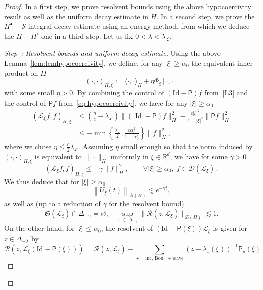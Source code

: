 \documentclass[10pt]{amsart}
\theoremstyle{definition}\newtheorem{defi}[theo]{Definition}\newtheorem{rema}[theo]{Remark}\newtheorem{exam}[theo]{Example}\newtheorem{exem}[theo]{Example}\newtheorem{nota}[theo]{Notation}
\DeclareMathOperator{\id}{Id}
\newcommand{\Id}{\mathrm{Id}}
\newcommand{\Wave}{\mathrm{wave}}
\newcommand{\Inc}{\mathrm{inc}}
\newcommand{\Bou}{\mathrm{Bou}}
\newcommand{\R}{\mathbb{R}}
\newcommand{\fkS}{\mathfrak{S}}
\newcommand{\LL}{\mathcal{L}}
\newcommand{\PP}{\mathsf{P}}
\newcommand{\RR}{\mathcal{R}}
\renewcommand{\SS}{\mathcal{S}}
\newcommand{\dom}{\mathscr{D}}
\newcommand{\BBB}{\mathscr{B}}
\newcommand{\Ss}{H}
\newcommand{\Ssp}{H^{\bullet}}
\newcommand{\Ssm}{H^{\circ}}
\renewcommand*\le{\leqslant}
\renewcommand*\ge{\geqslant}
\newcommand{\la}{\langle}
\newcommand{\ra}{\rangle}
\newcounter{stepcount}
\newenvironment{step}[1]{\refstepcounter{stepcount}\begin{proof}[Step~\thestepcount: #1]}{\let\qed\relax\end{proof}}
\let\oldforall\forall
\renewcommand*{\forall}{\mathrel{\oldforall}}
\begin{document}
\begin{proof}
In a first step, we prove resolvent bounds using the above hypocoercivity result as well as the uniform decay estimate in $\Ss$. In a second step, we prove the $\Ssp-\SS$ integral decay estimate using an energy method, from which we deduce the $\Ss-\Ssm$ one in a third step. Let us fix $0<\lambda < \lambda_\LL$.

\setcounter{stepcount}{0}
\begin{step}{{Resolvent bounds and uniform decay estimate}}
Using the above Lemma~\ref{lem:lemhypocoercivity}, we define, for any $|\xi| \ge \alpha_{0}$ the equivalent inner product on $\Ss$
\[
(\cdot, \cdot)_{\Ss, \xi} := \la \cdot, \cdot \ra_{\Ss} + \eta \Phi_\xi[\cdot, \cdot]
\]
with some small $\eta > 0$. By combining the control of $(\Id - \PP)f$ from~\eqref{L3} and the control of $\PP f$ from~\eqref{eq:hypocoercivity}, we have for any $| \xi | \ge \alpha_0$
\begin{align*}
\left(\LL_\xi f, f \right)_{\Ss, \xi} & \le \left(\frac{\eta}{c} - \lambda_\LL\right) \| (\id - \PP) f \|_{\Ss}^2 - \frac{c |\xi|^2}{1 + |\xi| ^2} \| \PP f \|^2_{\Ss} \\
& \le -\min\left\{ \frac{\lambda_\LL}{2}, \frac{c \alpha_{0} ^2 }{1 + \alpha_{0} ^2} \right\} \| f \|^2_{\Ss},
\end{align*}
where we chose $\eta \le \frac{c}{2} \lambda_\LL$. Assuming $\eta$ small enough so that the norm induced by~$(\cdot, \cdot)_{\Ss, \xi}$ is equivalent to $\| \cdot \|_{\Ss}$ uniformly in $\xi \in \R^d$, we have for some $\gamma > 0$
\begin{equation*}
\left(\LL_\xi f, f\right)_{\Ss, \xi} \le -\gamma \| f \|_{\Ss}^2, \qquad
\forall | \xi | \ge \alpha_0,~f \in \dom(\LL_{\xi})\,.
\end{equation*}
We thus deduce that for $| \xi | \ge \alpha_{0}$
\begin{equation*}
\left\| U_{\xi}(t) \right\|_{\BBB(\Ss)} \lesssim e^{-\gamma t},
\end{equation*}
as well as (up to a reduction of $\gamma$ for the resolvent bound)
\begin{equation*}
\fkS(\LL_{\xi}) \cap \Delta_{-\gamma} = \varnothing, \quad \sup_{z\,\in\,\Delta_{-\gamma}} \| \RR(z,\LL_{\xi}) \|_{\BBB(\Ss)} \lesssim 1.
\end{equation*}
On the other hand, for $|\xi| \le \alpha_{0}$, the resolvent of $(\Id - \PP(\xi)) \LL_\xi$ is given for $z \in \Delta_{-\lambda}$ by
\[
\RR(z,\LL_{\xi}(\Id-\PP(\xi)))=\RR(z,\LL_{\xi}) - \sum_{\star = \Inc,\,\Bou,\,\pm \Wave}(z-\lambda_{\star}(\xi))^{-1} \PP_\star(\xi)
\]
\end{step}
\end{proof}
\end{document}
